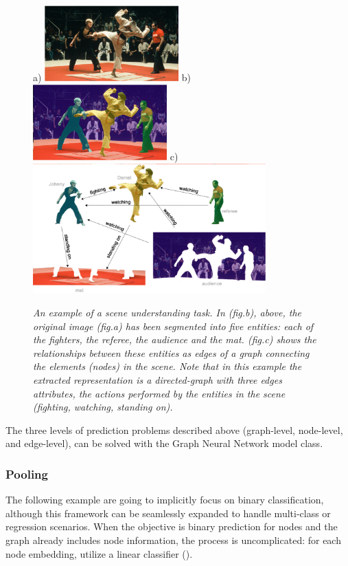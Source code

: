 \documentclass[binding=0.6cm]{sapthesis}
\newcommand{\mycite}[1]{(\cite{#1})}
\begin{document}
\begin{figure}
    \centering
    \footnotesize a) \includegraphics[width=0.46\textwidth]{imgs/background/scene-under-01.png}
    \footnotesize b) \includegraphics[width=0.46\textwidth]{imgs/background/scene-under-02.png}
    \footnotesize c) \includegraphics[width=0.8\textwidth]{imgs/background/scene-under-03.png}
    \caption{\textit{An example of a scene understanding task. In (fig.b), above, the original image (fig.a) has been segmented into five entities: each of the fighters, the referee, the audience and the mat. (fig.c) shows the relationships between these entities as edges of a graph connecting the elements (nodes) in the scene. Note that in this example the extracted representation is a directed-graph with three edges attributes, the actions performed by the entities in the scene (fighting, watching, standing on).}}
    \label{fig:bg.gnn.scene-under}
\end{figure}

The three levels of prediction problems described above (graph-level, node-level, and edge-level), can be solved with the Graph Neural Network model class. 

\subsubsection{Pooling}
\label{sec:bg.gnn.graph-pooling}
The following example are going to implicitly focus on binary classification, although this framework can be seamlessly expanded to handle multi-class or regression scenarios. When the objective is binary prediction for nodes and the graph already includes node information, the process is uncomplicated: for each node embedding, utilize a linear classifier \mycite{daigavane2021-conv-on-graphs}. 
\end{document}
